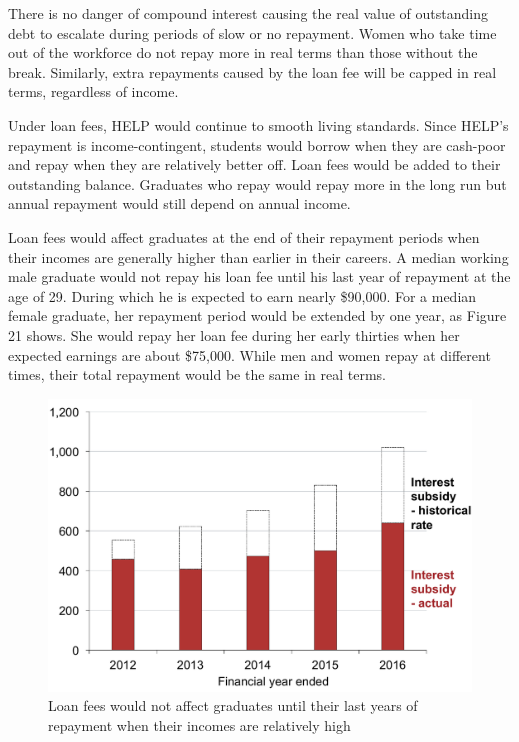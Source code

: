 \documentclass[embargoed]{grattan}
\begin{document}
There is no danger of compound interest causing the real value of outstanding debt to escalate during periods of slow or no repayment.
Women who take time out of the workforce do not repay more in real terms than those without the break.
Similarly, extra repayments caused by the loan fee will be capped in real terms, regardless of income.

Under loan fees, HELP would continue to smooth living standards.
Since HELP's repayment is income-contingent, students would borrow when they are cash-poor and repay when they are relatively better off.
Loan fees would be added to their outstanding balance.
Graduates who repay would repay more in the long run but annual repayment would still depend on annual income.

Loan fees would affect graduates at the end of their repayment periods when their incomes are generally higher than earlier in their careers.
A median working male graduate would not repay his loan fee until his last year of repayment at the age of 29.
During which he is expected to earn nearly \$90,000.
For a median female graduate, her repayment period would be extended by one year, as Figure 21 shows.
She would repay her loan fee during her early thirties when her expected earnings are about \$75,000.
While men and women repay at different times, their total repayment would be the same in real terms.

\begin{figure}
\caption{Loan fees would not affect graduates until their last years of repayment when their incomes are relatively high}\label{fig:fig21-loan-fees-would-not-affect-grads-until-their-last-years-of-repayment-when-their-incomes-are-relatively-high}


\includegraphics[page=21]{atlas/Chartpack.pdf}

\end{figure}
\end{document}
